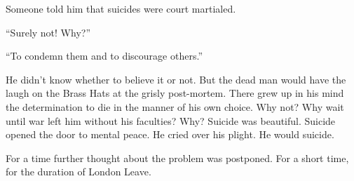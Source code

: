 Someone told him that suicides were court martialed.

``Surely not! Why?''

``To condemn them and to discourage others.''

He didn't know whether to believe it or not. But the dead man would have the laugh on the Brass Hats at the grisly post-mortem. There grew up in his mind the determination to die in the manner of his own choice. Why not? Why wait until war left him without his faculties? Why? Suicide was beautiful. Suicide opened the door to mental peace. He cried over his plight. He would suicide.

For a time further thought about the problem was postponed. For a short time, for the duration of London Leave.
